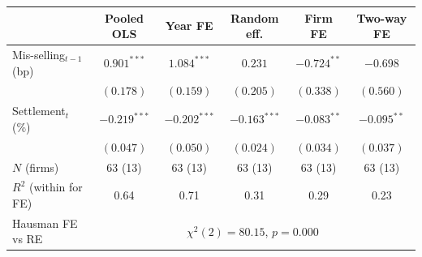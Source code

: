 \begin{tabular}{lccccc}
\toprule
 & Pooled OLS & Year FE & Random eff. & Firm FE & Two-way FE \\
\midrule
Mis-selling$_{t-1}$ (bp) & $0.901^{***}$ & $1.084^{***}$ & $0.231$ & $-0.724^{**}$ & $-0.698$ \\
 & $(0.178)$ & $(0.159)$ & $(0.205)$ & $(0.338)$ & $(0.560)$ \\
Settlement$_t$ (\%) & $-0.219^{***}$ & $-0.202^{***}$ & $-0.163^{***}$ & $-0.083^{**}$ & $-0.095^{**}$ \\
 & $(0.047)$ & $(0.050)$ & $(0.024)$ & $(0.034)$ & $(0.037)$ \\
\midrule
$N$ (firms) & 63 (13) & 63 (13) & 63 (13) & 63 (13) & 63 (13) \\
$R^2$ (within for FE) & 0.64 & 0.71 & 0.31 & 0.29 & 0.23 \\
Hausman FE vs RE & \multicolumn{5}{c}{$\chi^2(2)=80.15$, $p=0.000$} \\
\bottomrule
\end{tabular}